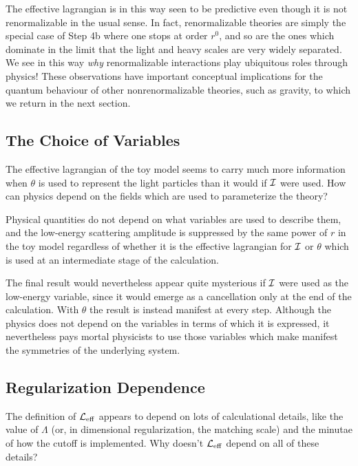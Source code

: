 The effective lagrangian is in this way seen to be predictive
even though it is not renormalizable in the usual sense. In
fact, renormalizable theories are simply the special case
of Step 4b where one stops at order $r^0$, and so are the
ones which dominate in the limit that the light and heavy
scales are very widely separated. 
We see in this way {\it why} renormalizable interactions 
play ubiquitous roles through physics!
These observations have important
conceptual implications for the quantum behaviour of
other nonrenormalizable theories, such as gravity, to which
we return in the next section. 

\subsection{The Choice of Variables}

The effective lagrangian of the toy model seems to
carry much more information when $\theta$ is used to 
represent the light particles than it would if ${\cal I}$ 
were used.
How can physics depend on the fields which are used
to parameterize the theory?

Physical quantities do not depend on what variables are
used to describe them, and the low-energy
scattering amplitude is suppressed by the same power
of $r$ in the toy model regardless of whether it is
the effective lagrangian for ${\cal I}$ or $\theta$
which is used at an intermediate stage of the calculation.

The final result would nevertheless
appear quite mysterious if ${\cal I}$ were
used as the low-energy variable, since it would emerge as
a cancellation only at the end of the calculation. With
$\theta$ the result is instead manifest at every step. 
Although the physics does not depend on the variables
in terms of which it is expressed, it nevertheless pays
mortal physicists to use those variables which make
manifest the symmetries of the underlying system.

\subsection{Regularization Dependence}

The definition of ${\cal L}_{\rm eff}$ appears to
depend on lots of calculational details, like the value of $\Lambda$
(or, in dimensional regularization, the matching scale) and
the minutae of how the cutoff is implemented. Why doesn't
${\cal L}_{\rm eff}$ depend on all of these details? 

